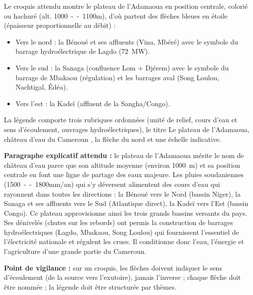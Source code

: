 \documentclass[11pt]{article}
\newcounter{popsec}
\newcounter{popsub}
\newcommand{\courssub}[1]{%
  \stepcounter{popsub}%
  \par\vspace{9pt}\noindent{\popxbold\fontsize{11.5}{13}\selectfont\color{popink}{\color{poporange}\thepopsec.\thepopsub}\hspace{6pt}#1}\par\nopagebreak\vspace{4pt}
}
\begin{document}
\begin{corrige}
Le croquis attendu montre le plateau de l'Adamaoua en position centrale, colorié ou hachuré (alt. \SI{1000}{--1100}{m}), d'où partent des flèches bleues en étoile (épaisseur proportionnelle au débit) :
\begin{itemize}
\item Vers le nord : la Bénoué et ses affluents (Vina, Mbéré) avec le symbole du barrage hydroélectrique de Lagdo (\SI{72}{MW}).
\item Vers le sud : la Sanaga (confluence Lom + Djérem) avec le symbole du barrage de Mbakaou (régulation) et les barrages aval (Song Loulou, Nachtigal, Édéa).
\item Vers l'est : la Kadeï (affluent de la Sangha/Congo).
\end{itemize}
La légende comporte trois rubriques ordonnées (unité de relief, cours d'eau et sens d'écoulement, ouvrages hydroélectriques), le titre \og Le plateau de l'Adamaoua, château d'eau du Cameroun \fg, la flèche du nord et une échelle indicative.

\textbf{Paragraphe explicatif attendu :} le plateau de l'Adamaoua mérite le nom de \og château d'eau \fg{} parce que son altitude moyenne (environ \SI{1000}{m}) et sa position centrale en font une ligne de partage des eaux majeure. Les pluies soudaniennes (\SI{1500}{--1800}{mm/an}) qui s'y déversent alimentent des cours d'eau qui rayonnent dans toutes les directions : la Bénoué vers le Nord (bassin Niger), la Sanaga et ses affluents vers le Sud (Atlantique direct), la Kadeï vers l'Est (bassin Congo). Ce plateau approvisionne ainsi les trois grands bassins versants du pays. Ses dénivelés (chutes sur les rebords) ont permis la construction de barrages hydroélectriques (Lagdo, Mbakaou, Song Loulou) qui fournissent l'essentiel de l'électricité nationale et régulent les crues. Il conditionne donc l'eau, l'énergie et l'agriculture d'une grande partie du Cameroun.

\textbf{Point de vigilance :} sur un croquis, les flèches doivent indiquer le sens d'écoulement (de la source vers l'exutoire), jamais l'inverse ; chaque flèche doit être nommée ; la légende doit être structurée par thèmes.
\end{corrige}

\courssub{Je me prépare au Bac}
\end{document}
